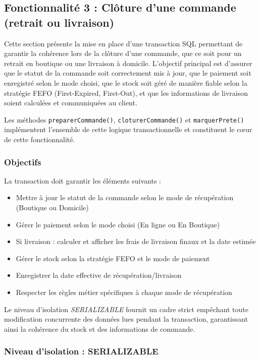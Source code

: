 \subsection{Fonctionnalité 3 : Clôture d'une commande (retrait ou livraison)}

Cette section présente la mise en place d'une transaction SQL permettant de garantir la cohérence lors de la clôture d'une commande, que ce soit pour un retrait en boutique ou une livraison à domicile. L'objectif principal est d'assurer que le statut de la commande soit correctement mis à jour, que le paiement soit enregistré selon le mode choisi, que le stock soit géré de manière fiable selon la stratégie FEFO (First-Expired, First-Out), et que les informations de livraison soient calculées et communiquées au client.

Les méthodes \texttt{preparerCommande()}, \texttt{cloturerCommande()} et \texttt{marquerPrete()} implémentent l'ensemble de cette logique transactionnelle et constituent le cœur de cette fonctionnalité.

\subsubsection{Objectifs}

La transaction doit garantir les éléments suivants :

\begin{itemize}
    \item Mettre à jour le statut de la commande selon le mode de récupération (Boutique ou Domicile)
    \item Gérer le paiement selon le mode choisi (En ligne ou En Boutique)
    \item Si livraison : calculer et afficher les frais de livraison finaux et la date estimée
    \item Gérer le stock selon la stratégie FEFO et le mode de paiement
    \item Enregistrer la date effective de récupération/livraison
    \item Respecter les règles métier spécifiques à chaque mode de récupération
\end{itemize}

Le niveau d'isolation \textit{SERIALIZABLE} fournit un cadre strict empêchant toute modification concurrente des données lues pendant la transaction, garantissant ainsi la cohérence du stock et des informations de commande.

\subsubsection{Niveau d'isolation : SERIALIZABLE}

